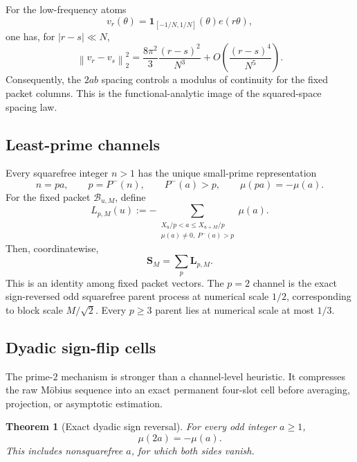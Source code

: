 \documentclass[11pt]{article}
\newtheorem{theorem}{Theorem}[section]
\theoremstyle{definition}
\theoremstyle{remark}
\newcommand{\1}{\mathbf{1}}
\newcommand{\vect}[1]{\bm{#1}}
\newcommand{\norm}[1]{\left\lVert #1\right\rVert}
\begin{document}
For the low-frequency atoms
\[
 v_r(\theta)=\1_{[-1/N,1/N]}(\theta)e(r\theta),
\]
one has, for $|r-s|\ll N$,
\begin{equation}
 \norm{v_r-v_s}_2^2
 =\frac{8\pi^2}{3}\frac{(r-s)^2}{N^3}
 +O\!\left(\frac{(r-s)^4}{N^5}\right).
 \label{eq:packet-column-modulus}
\end{equation}
Consequently, the $2ab$ spacing controls a modulus of continuity for the fixed packet
columns.  This is the functional-analytic image of the squared-space spacing law.

\subsection{Least-prime channels}

Every squarefree integer $n>1$ has the unique small-prime representation
\[
 n=pa,
 \qquad p=P^-(n),
 \qquad P^-(a)>p,
 \qquad \mu(pa)=-\mu(a).
\]
For the fixed packet $\mathcal B_{u,M}$, define
\begin{equation}
 L_{p,M}(u)
 :=-\!\!\sum_{\substack{X_u/p<a\le X_{u+M}/p\\
                         \mu(a)\ne0,\ P^-(a)>p}}
       \mu(a).
 \label{eq:small-prime-layer-fixed}
\end{equation}
Then, coordinatewise,
\begin{equation}
 \vect S_M=\sum_p\vect L_{p,M}.
 \label{eq:small-prime-fixed-recursion}
\end{equation}
This is an identity among fixed packet vectors.  The $p=2$ channel is the exact
sign-reversed odd squarefree parent process at numerical scale $1/2$, corresponding
to block scale $M/\sqrt2$.  Every $p\ge3$ parent lies at numerical scale at most
$1/3$.

\subsection{Dyadic sign-flip cells}
\label{subsec:exact-dyadic-cells}

The prime-$2$ mechanism is stronger than a channel-level heuristic.  It compresses
the raw M\"obius sequence into an exact permanent four-slot cell before averaging,
projection, or asymptotic estimation.

\begin{theorem}[Exact dyadic sign reversal]
\label{thm:exact-dyadic-sign-reversal}
For every odd integer $a\ge1$,
\begin{equation}
 \boxed{\mu(2a)=-\mu(a).}
 \label{eq:mobius-doubling-odd}
\end{equation}
This includes nonsquarefree $a$, for which both sides vanish.
\end{theorem}
\end{document}
